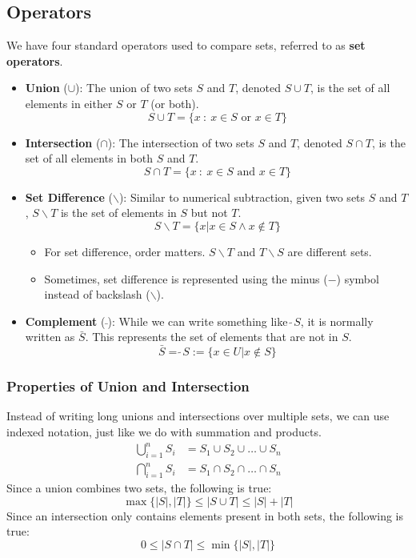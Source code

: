 \documentclass[10pt]{article}
\begin{document}
\subsection*{Operators}
We have four standard operators used to compare sets, referred to as \textbf{set operators}.
\begin{itemize}
	\item \textbf{Union} ($\cup$): The union of two sets $S$ and $T$, denoted $S \cup T$, is the set of all elements in either $S$ or $T$ (or both).
	\[S \cup T = \{x \::\: x \in S \text{ or } x \in T\}\]
    \item \textbf{Intersection} ($\cap$): The intersection of two sets $S$ and $T$, denoted $S \cap T$, is the set of all elements in both $S$ and $T$.
    \[S \cap T = \{x \::\: x \in S \text{ and } x \in T\}\]
    \item \textbf{Set Difference} ($\backslash$): Similar to numerical subtraction, given two sets $S$ and $T$, $S \backslash T$ is the set of elements in $S$ but not $T$.
    \[S \backslash T = \{x | x \in S \land x \notin T\}\]
    \begin{itemize}
	    \item For set difference, order matters. $S \backslash T$ and $T \backslash S$ are different sets.
	    \item Sometimes, set difference is represented using the minus ($-$) symbol instead of backslash ($\backslash$).
    \end{itemize}
    \item \textbf{Complement} ($\bar{\:}$): While we can write something like $\tilde{\:} S$, it is normally written as $\bar{S}$.  This represents the set of elements that are not in $S$.
    \[\bar{S} = \tilde{\:} S := \{x \in U | x \notin S\}\]

\end{itemize}

\subsubsection*{Properties of Union and Intersection}
Instead of writing long unions and intersections over multiple sets, we can use indexed notation, just like we do with summation and products.
\begin{align*}
    \bigcup_{i = 1}^n S_i &= S_1 \cup S_2 \cup \dots \cup S_n\\
    \bigcap_{i = 1}^n S_i &= S_1 \cap S_2 \cap \dots \cap S_n
\end{align*}
Since a union combines two sets, the following is true:
\[\max\{|S|, |T|\} \leq |S \cup T| \leq |S| + |T|\]
Since an intersection only contains elements present in both sets, the following is true:
\[0 \leq |S \cap T| \leq \min\{|S|, |T|\}\]
\end{document}
